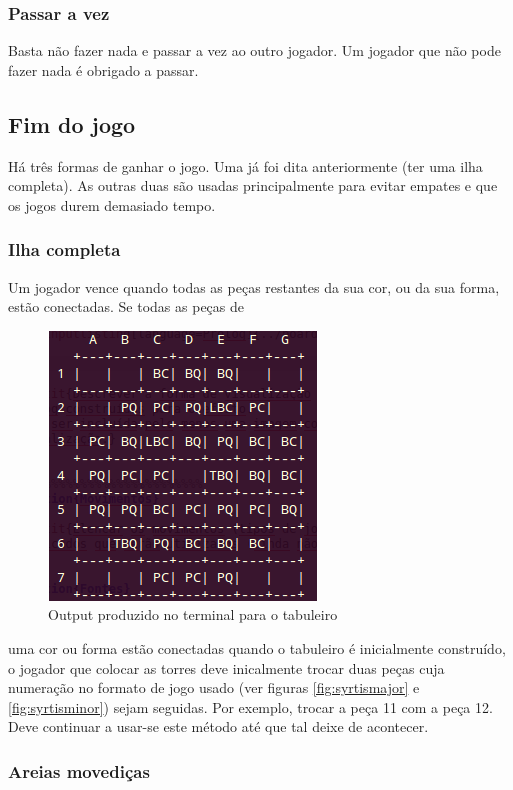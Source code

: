 \documentclass[a4paper]{article}
\begin{document}
\subsubsection{Passar a vez}

Basta não fazer nada e passar a vez ao outro jogador. Um jogador que não pode fazer nada é obrigado a passar.


\subsection{Fim do jogo}
\label{endgame}

Há três formas de ganhar o jogo. Uma já foi dita anteriormente (ter uma ilha completa). As outras duas são usadas principalmente para evitar empates e que os jogos durem demasiado tempo.

\subsubsection{Ilha completa}

Um jogador vence quando todas as peças restantes da sua cor, ou da sua forma, estão conectadas.
Se todas as peças de\begin{figure}[h]
\centering
\includegraphics[scale=0.5]{outputboard.png}
\caption{Output produzido no terminal para o tabuleiro}
\label{fig:outputboard}
\end{figure} uma cor ou forma estão conectadas quando o tabuleiro é inicialmente construído, o jogador que colocar as torres deve inicalmente trocar duas peças cuja numeração no formato de jogo usado (ver figuras \ref{fig:syrtismajor} e \ref{fig:syrtisminor}) sejam seguidas. Por exemplo, trocar a peça 11 com a peça 12. Deve continuar a usar-se este método até que tal deixe de acontecer.

\subsubsection{Areias movediças}
\end{document}
